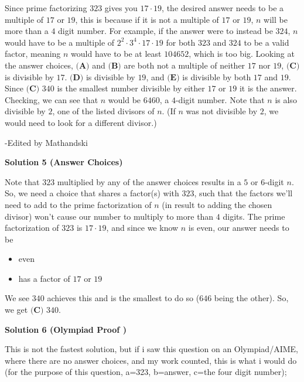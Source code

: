 \begin{enumerate}
Since prime factorizing $323$ gives you $17 \cdot 19$, the desired answer needs to be a multiple of $17$ or $19$, this is because if it is not a multiple of $17$ or $19$, $n$ will be more than a $4$ digit number. For example, if the answer were to instead be $324$, $n$ would have to be a multiple of $2^2\cdot3^4\cdot17\cdot19$ for both $323$ and $324$ to be a valid factor, meaning $n$ would have to be at least $104652$, which is too big. Looking at the answer choices, $\textbf{(A)}$ and $\textbf{(B)}$ are both not a multiple of neither $17$ nor $19$, $\textbf{(C)}$ is divisible by $17$. $\textbf{(D)}$ is divisible by $19$, and $\textbf{(E)}$ is divisible by both $17$ and $19$. Since $\boxed{\textbf{(C) } 340}$ is the smallest number divisible by either $17$ or $19$ it is the answer. Checking, we can see that $n$ would be $6460$, a $4$-digit number. Note that $n$ is also divisible by $2$, one of the listed divisors of $n$. (If $n$ was not divisible by $2$, we would need to look for a different divisor.)

 -Edited by Mathandski

 



\textbf{Solution 5 (Answer Choices)}

Note that $323$ multiplied by any of the answer choices results in a $5$ or $6$-digit $n$. So, we need a choice that shares a factor(s) with $323$, such that the factors we'll need to add to the prime factorization of $n$ (in result to adding the chosen divisor) won't cause our number to multiply to more than $4$ digits. The prime factorization of $323$ is $17\cdot19$, and since we know $n$ is even, our answer needs to be 

 
            \begin{itemize}
        \item even
            \end{itemize}
            
            \begin{itemize}
        \item has a factor of $17$ or $19$
            \end{itemize}
            We see $340$ achieves this and is the smallest to do so ($646$ being the other). So, we get $\boxed{\textbf{(C) } 340}$.

 



\textbf{Solution 6 (Olympiad Proof )}

This is not the fastest solution, but if i saw this question on an Olympiad/AIME, where there are no answer choices, and my work counted, this is what i would do (for the purpose of this question, a=323, b=answer, c=the four digit number);


\end{enumerate}
